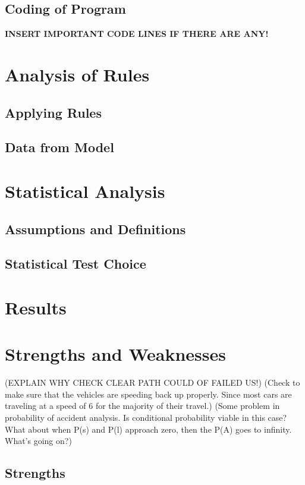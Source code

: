 \documentclass{amsart}
\begin{document}
	\subsection{Coding of Program}
	
	\textbf{INSERT IMPORTANT CODE LINES IF THERE ARE ANY!}

\section{\bfseries{Analysis of Rules}}
	\subsection{Applying Rules}
	\subsection{Data from Model}
	
	

\section{\bfseries{Statistical Analysis}}
	\subsection{Assumptions and Definitions}
	\subsection{Statistical Test Choice}

\section{\bfseries{Results}}

\section{\bfseries{Strengths and Weaknesses}}

(EXPLAIN WHY CHECK CLEAR PATH COULD OF FAILED US!)
(Check to make sure that the vehicles are speeding back up properly.  Since most cars are traveling at a speed of 6 for the majority of their travel.) 
(Some problem in probability of accident analysis.  Is conditional probability viable in this case? What about when P(s) and P(l) approach zero, then the P(A) goes to infinity. What's going on?) 

\subsection{Strengths}
\end{document}
